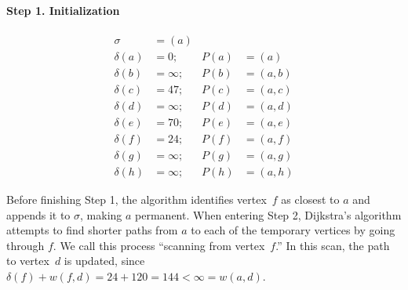 \documentclass[10pt,]{book}
\theoremstyle{plain}
\theoremstyle{definition}
\theoremstyle{definition}
\theoremstyle{definition}
\theoremstyle{definition}
\numberwithin{equation}{section}
\newcommand{\lt}{<}
\newcommand{\amp}{&}
\begin{document}
\paragraph[{Step 1. Initialization}]{Step 1. Initialization}\hypertarget{paragraphs-1}{}
\hypertarget{p-208}{}%
%
\begin{align*}
\sigma\amp=(a)\amp\amp\\
\delta(a)\amp=0; \amp P(a)\amp=(a)\\
\delta(b) \amp=\infty; \amp P(b)\amp=(a,b)\\
\delta(c) \amp=47; \amp P(c)\amp=(a,c)\\
\delta(d) \amp=\infty; \amp P(d)\amp=(a,d)\\
\delta(e) \amp=70; \amp P(e)\amp=(a,e)\\
\delta(f) \amp=24; \amp P(f)\amp=(a,f)\\
\delta(g) \amp=\infty; \amp P(g)\amp=(a,g)\\
\delta(h) \amp=\infty; \amp P(h)\amp=(a,h)
\end{align*}
%
\par
\hypertarget{p-209}{}%
Before finishing Step 1, the algorithm identifies vertex~\(f\) as closest to \(a\) and appends it to \(\sigma\), making \(a\) permanent. When entering Step 2, Dijkstra's algorithm attempts to find shorter paths from \(a\) to each of the temporary vertices by going through \(f\). We call this process ``scanning from vertex~\(f\).'' In this scan, the path to vertex~\(d\) is updated, since \(\delta(f) + w(f,d)=24+120=144\lt \infty=w(a,d)\).%
\typeout{************************************************}
\typeout{************************************************}
\end{document}
